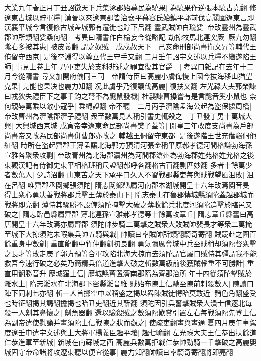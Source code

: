 大業九年春正月丁丑詔徵天下兵集涿郡始募民為驍果|{
	為驍果作逆張本驍古堯翻}
修遼東古城以貯軍糧|{
	漢晉以來遼東郡皆治襄平慕容氏始鎮平郭前伐高麗圍遼東言即漢襄平城今言復修古城盖城郭有遷徙也貯下呂翻}
靈武賊帥白瑜娑|{
	帝改靈州為靈武郡帥所類翻娑桑何翻　考異曰隋書作白榆妄今從略記}
劫掠牧馬北連突厥|{
	厥九勿翻}
隴右多被其患|{
	被皮義翻}
謂之奴賊　戊戍赦天下　己亥命刑部尚書衛文昇等輔代王侑留守西京|{
	是後李淵得以尊立代王守手又翻}
二月壬午詔宇文述以兵糧不繼遂陷王師|{
	事見上卷上年}
乃軍吏失於支科非述之罪宜復其官爵　|{
	考異曰雜記在去年十二月今從隋書}
尋又加開府儀同三司　帝謂侍臣曰高麗小虜侮慢上國今抜海移山猶望克果|{
	克能也果决也麗力知翻}
况此虜乎乃復議伐高麗|{
	復扶又翻}
左光祿大夫郭榮諫曰戎狄失禮臣下之事千鈞之弩不為鼷鼠發機|{
	杜襲諫曹操嘗有是言鼷音奚小鼠也}
柰何親辱萬乘以敵小寇乎|{
	乘䋲證翻}
帝不聽　二月丙子濟隂孟海公起為盗保㨿周橋|{
	帝改曹州為濟隂郡濟子禮翻}
衆至數萬見人稱引書史輒殺之　丁丑發丁男十萬城大興|{
	大興城西京城}
戊寅帝幸遼東命民部尚書樊子蓋等|{
	開皇三年改度支尚書為戶部尚書帝又改為民部尚書併曹郎亦改之}
輔越王侗留守東都|{
	是後遂階王世充僭竊侗他紅翻}
時所在盗起齊郡王薄孟讓北海郭方預清河張金稱平原郝孝德河間格謙勃海孫宣雅各聚衆攻剽|{
	帝改青州為北海郡瀛州為河間郡滄州為勃海郡姓苑格姓允格之後東觀漢記有侍御史東平相格班稱尺證翻郝呼各翻格古百翻剽匹妙翻}
多者十餘萬少者數萬人|{
	少詩沼翻}
山東苦之天下承平曰久人不習戰郡縣吏每與賊戰望風沮敗|{
	沮在呂翻}
唯齊郡丞閺鄉張須陀|{
	隋志閺鄉縣屬河南郡本湖城開皇十六年改焉閺音旻}
得士衆心勇决善戰將郡兵擊王薄於泰山下|{
	隋志泰山在魯郡慱城縣須陀蓋越郡城而戰將即亮翻}
薄恃其驟勝不設備須陀掩擊大破之薄收餘兵北度河須陀追擊於臨邑又破之|{
	隋志臨邑縣屬齊郡}
薄北連孫宣雅郝孝德等十餘萬攻章丘|{
	隋志章丘縣舊曰高唐開皇十六年改焉亦屬齊郡}
須陀帥步騎二萬擊之賊衆大敗賊帥裴長才等衆二萬掩至城下大掠須陀未暇集兵帥五騎與戰|{
	帥讀曰率賊帥所類翻騎奇寄翻}
賊競赴之圍百餘重身中數創|{
	重直龍翻中竹仲翻創初良翻}
勇氣彌厲會城中兵至賊稍却須陀督衆擊之長才等敗走庚子郭方預等合軍攻陷北海大掠而去須陀謂官屬曰賊恃其彊謂我不能救吾今速行破之必矣乃簡精兵倍道進擊大破之斬數萬級前後獲賊輜重不可勝計|{
	重直用翻勝音升}
歷城羅士信|{
	歷城縣舊置濟南郡隋為齊郡治所}
年十四從須陀擊賊於濰水上|{
	隋志濰水在北海郡下密縣濰音維}
賊始布陳士信馳至陳前刺殺數人|{
	陳讀曰陣下同刺七亦翻}
斬一人首擲空中以稍盛之掲以畧陳賊徒愕眙莫敢近|{
	矟色角翻盛受也時征翻掲其謁翻擔掲也眙丑吏翻近其靳翻}
須陀因引兵奮擊賊衆大潰士信逐北每殺一人劓其鼻懷之|{
	劓魚器翻}
還以驗殺賊之數須陀歎賞引置左右每戰須陀先登士信為副帝遣使慰諭并畫須陀士信戰陳之狀而觀之|{
	使疏吏翻畫與晝通}
夏四月庚午車駕度遼壬申遣宇文述與上大將軍楊義臣趣平壤|{
	趣七喻翻}
左光祿大夫王仁恭出扶餘道仁恭進軍至新城|{
	新城在南蘇城之西}
高麗兵數萬拒戰仁恭帥勁騎一千擊破之高麗嬰城固守帝命諸將攻遼東聽以便宜從事|{
	麗力知翻帥讀曰率騎奇寄翻將即亮翻}
